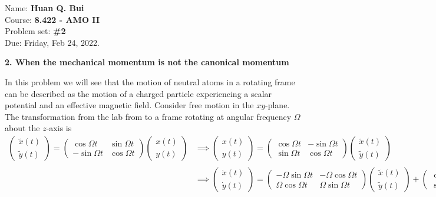 \documentclass{article}
\theoremstyle{definition}
\begin{document}
\begin{framed}
\noindent Name: \textbf{Huan Q. Bui}\\
Course: \textbf{8.422 - AMO II}\\
Problem set: \textbf{\#2}\\
Due: Friday, Feb 24, 2022.
\end{framed}
	
	




\noindent \textbf{2. When the mechanical momentum is not the canonical momentum}

\noindent In this problem we will see that the motion of neutral atoms in a rotating frame can be described as the motion of a charged particle experiencing a scalar potential and an effective magnetic field. Consider free motion in the $xy$-plane. The transformation from the lab from to a frame rotating at angular frequency $\Omega$ about the $z$-axis is 
\begin{align*}
	\begin{pmatrix}
		\tilde{x}(t) \\  \tilde{y}(t)
	\end{pmatrix}
	= 
	\begin{pmatrix}
		\cos \Omega t  & \sin\Omega t \\ -\sin\Omega t & \cos\Omega t 
	\end{pmatrix}
	\begin{pmatrix}
		x(t) \\ y(t)
	\end{pmatrix}
	&\implies 
	\begin{pmatrix}
		{x}(t) \\  {y}(t)
	\end{pmatrix}
	= 
	\begin{pmatrix}
		\cos \Omega t  & -\sin\Omega t \\ \sin\Omega t & \cos\Omega t 
	\end{pmatrix}
	\begin{pmatrix}
		\tilde{x}(t) \\ \tilde{y}(t)
	\end{pmatrix} \\
	& \implies
	\begin{pmatrix}
		\dot{x}(t) \\  \dot{y}(t)
	\end{pmatrix}
	= 
	\begin{pmatrix}
		-\Omega \sin \Omega t  & -\Omega \cos\Omega t \\ \Omega \cos\Omega t & \Omega \sin\Omega t 
	\end{pmatrix} \begin{pmatrix}
	\tilde{x}(t) \\ \tilde{y}(t)
\end{pmatrix}
	+ 
	\begin{pmatrix}
	\cos \Omega t  & -\sin\Omega t \\ \sin\Omega t & \cos\Omega t 
	\end{pmatrix}
	\begin{pmatrix}
	\dot{\tilde{x}}(t) \\ \dot{\tilde{y}}(t)
	\end{pmatrix}
\end{align*}
\end{document}
